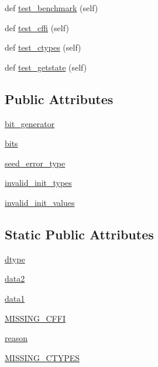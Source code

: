 \begin{DoxyCompactItemize}
\item 
def \hyperlink{classnumpy_1_1random_1_1tests_1_1test__direct_1_1Base_a17017a737372cee3073e4ecce5d414b3}{test\+\_\+benchmark} (self)
\item 
def \hyperlink{classnumpy_1_1random_1_1tests_1_1test__direct_1_1Base_a246dbe7e16778041a078eaa1e042a86d}{test\+\_\+cffi} (self)
\item 
def \hyperlink{classnumpy_1_1random_1_1tests_1_1test__direct_1_1Base_a4ddc0e8d2e78b553387cad56363bfb73}{test\+\_\+ctypes} (self)
\item 
def \hyperlink{classnumpy_1_1random_1_1tests_1_1test__direct_1_1Base_aa5a120dd41a23e358abe7703dcffbfcf}{test\+\_\+getstate} (self)
\end{DoxyCompactItemize}
\subsection*{Public Attributes}
\begin{DoxyCompactItemize}
\item 
\hyperlink{classnumpy_1_1random_1_1tests_1_1test__direct_1_1Base_ac1fac59afbbd90b74725164246b2fb64}{bit\+\_\+generator}
\item 
\hyperlink{classnumpy_1_1random_1_1tests_1_1test__direct_1_1Base_ae19ff4f0e4712d8d0096ac4a01b34ee3}{bits}
\item 
\hyperlink{classnumpy_1_1random_1_1tests_1_1test__direct_1_1Base_ad0a94be8c19dcec62261b8204b88ee77}{seed\+\_\+error\+\_\+type}
\item 
\hyperlink{classnumpy_1_1random_1_1tests_1_1test__direct_1_1Base_a4eedaec4d299e7ae4f2eddcbd55b8f6b}{invalid\+\_\+init\+\_\+types}
\item 
\hyperlink{classnumpy_1_1random_1_1tests_1_1test__direct_1_1Base_a2a56f9c68992f46ba0b0a27e0d1c6bea}{invalid\+\_\+init\+\_\+values}
\end{DoxyCompactItemize}
\subsection*{Static Public Attributes}
\begin{DoxyCompactItemize}
\item 
\hyperlink{classnumpy_1_1random_1_1tests_1_1test__direct_1_1Base_a6538c964868d693d2112838ca5a4b45c}{dtype}
\item 
\hyperlink{classnumpy_1_1random_1_1tests_1_1test__direct_1_1Base_ad08f8a8fe2e2549c4503cdb2f05760c9}{data2}
\item 
\hyperlink{classnumpy_1_1random_1_1tests_1_1test__direct_1_1Base_a884aaa99854ebd91bc7f5ac978f6fa07}{data1}
\item 
\hyperlink{classnumpy_1_1random_1_1tests_1_1test__direct_1_1Base_a17dd4e2b1217f740919e9117e47e12f0}{M\+I\+S\+S\+I\+N\+G\+\_\+\+C\+F\+FI}
\item 
\hyperlink{classnumpy_1_1random_1_1tests_1_1test__direct_1_1Base_a5320869af50fdf86bb6f0bfdbc4c64de}{reason}
\item 
\hyperlink{classnumpy_1_1random_1_1tests_1_1test__direct_1_1Base_abcb343bde64fb442c9c37964ccbece30}{M\+I\+S\+S\+I\+N\+G\+\_\+\+C\+T\+Y\+P\+ES}
\end{DoxyCompactItemize}


